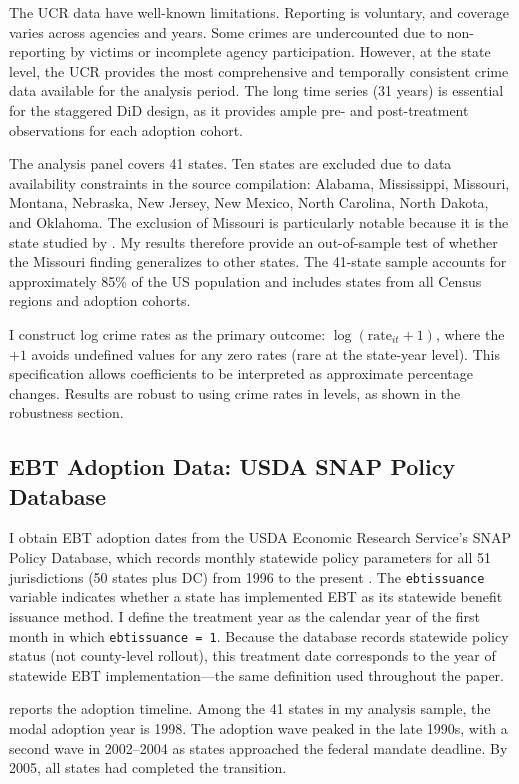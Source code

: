 \documentclass[12pt]{article}
\begin{document}
The UCR data have well-known limitations. Reporting is voluntary, and coverage varies across agencies and years. Some crimes are undercounted due to non-reporting by victims or incomplete agency participation. However, at the state level, the UCR provides the most comprehensive and temporally consistent crime data available for the analysis period. The long time series (31 years) is essential for the staggered DiD design, as it provides ample pre- and post-treatment observations for each adoption cohort.

The analysis panel covers 41 states. Ten states are excluded due to data availability constraints in the source compilation: Alabama, Mississippi, Missouri, Montana, Nebraska, New Jersey, New Mexico, North Carolina, North Dakota, and Oklahoma. The exclusion of Missouri is particularly notable because it is the state studied by \citet{wright2017less}. My results therefore provide an out-of-sample test of whether the Missouri finding generalizes to other states. The 41-state sample accounts for approximately 85\% of the US population and includes states from all Census regions and adoption cohorts.

I construct log crime rates as the primary outcome: $\log(\text{rate}_{it} + 1)$, where the $+1$ avoids undefined values for any zero rates (rare at the state-year level). This specification allows coefficients to be interpreted as approximate percentage changes. Results are robust to using crime rates in levels, as shown in the robustness section.

\subsection{EBT Adoption Data: USDA SNAP Policy Database}

I obtain EBT adoption dates from the USDA Economic Research Service's SNAP Policy Database, which records monthly statewide policy parameters for all 51 jurisdictions (50 states plus DC) from 1996 to the present \citep{usda2024snapdb}. The \texttt{ebtissuance} variable indicates whether a state has implemented EBT as its statewide benefit issuance method. I define the treatment year as the calendar year of the first month in which \texttt{ebtissuance = 1}. Because the database records statewide policy status (not county-level rollout), this treatment date corresponds to the year of statewide EBT implementation---the same definition used throughout the paper.

 reports the adoption timeline. Among the 41 states in my analysis sample, the modal adoption year is 1998. The adoption wave peaked in the late 1990s, with a second wave in 2002--2004 as states approached the federal mandate deadline. By 2005, all states had completed the transition.
\end{document}
